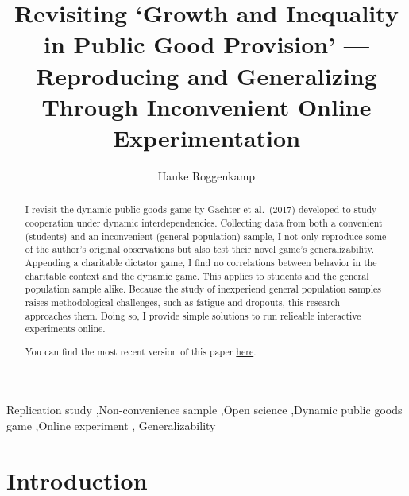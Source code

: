 \documentclass[
  authoryear,
  preprint,
  3p]{elsarticle}
\begin{document}
\begin{frontmatter}
\title{Revisiting `Growth and Inequality in Public Good Provision'
---Reproducing and Generalizing Through Inconvenient Online
Experimentation}
\author[1,2]{Hauke Roggenkamp%
%
}



        
\begin{abstract}
I revisit the dynamic public goods game by Gächter et al.~(2017)
developed to study cooperation under dynamic interdependencies.
Collecting data from both a convenient (students) and an inconvenient
(general population) sample, I not only reproduce some of the author's
original observations but also test their novel game's generalizability.
Appending a charitable dictator game, I find no correlations between
behavior in the charitable context and the dynamic game. This applies to
students and the general population sample alike. Because the study of
inexperiend general population samples raises methodological challenges,
such as fatigue and dropouts, this research approaches them. Doing so, I
provide simple solutions to run relieable interactive experiments
online.

You can find the most recent version of this paper
\href{https://github.com/Howquez/coopUncertainty/blob/main/analysis/quarto/paper.pdf}{here}.
\end{abstract}





\begin{keyword}
    Replication study \sep Non-convenience sample \sep Open
science \sep Dynamic public goods game \sep Online experiment \sep 
    Generalizability
\end{keyword}
\end{frontmatter}\ifdefined\Shaded\renewenvironment{Shaded}{\begin{tcolorbox}[frame hidden, breakable, interior hidden, boxrule=0pt, enhanced, borderline west={3pt}{0pt}{shadecolor}, sharp corners]}{\end{tcolorbox}}\fi

\hypertarget{sec-intro}{%
\section{Introduction}\label{sec-intro}}
\end{document}

